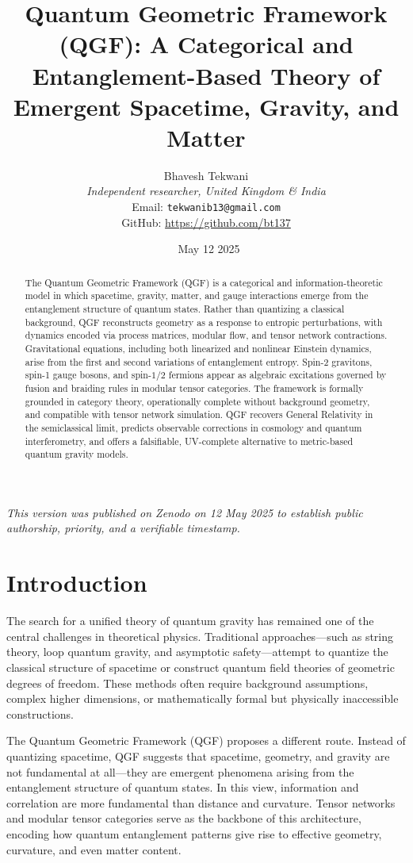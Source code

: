 \documentclass[11pt]{article}
\title{Quantum Geometric Framework (QGF): A Categorical and Entanglement-Based Theory of Emergent Spacetime, Gravity, and Matter}
\author{
  Bhavesh Tekwani \\
  \textit{Independent researcher, United Kingdom \& India} \\
  Email: \texttt{tekwanib13@gmail.com} \\
  GitHub: \url{https://github.com/bt137}
}
\date{\ May 12 2025}
\def\frac#1#2{#1/#2}
\begin{document}
\maketitle

\begin{abstract}
The Quantum Geometric Framework (QGF) is a categorical and information-theoretic model in which spacetime, gravity, matter, and gauge interactions emerge from the entanglement structure of quantum states. Rather than quantizing a classical background, QGF reconstructs geometry as a response to entropic perturbations, with dynamics encoded via process matrices, modular flow, and tensor network contractions. Gravitational equations, including both linearized and nonlinear Einstein dynamics, arise from the first and second variations of entanglement entropy. Spin-2 gravitons, spin-1 gauge bosons, and spin-$\frac{1}{2}$ fermions appear as algebraic excitations governed by fusion and braiding rules in modular tensor categories. The framework is formally grounded in category theory, operationally complete without background geometry, and compatible with tensor network simulation. QGF recovers General Relativity in the semiclassical limit, predicts observable corrections in cosmology and quantum interferometry, and offers a falsifiable, UV-complete alternative to metric-based quantum gravity models.
\end{abstract}


\vspace{1ex}
\noindent\textit{This version was published on Zenodo on 12 May 2025 to establish public authorship, priority, and a verifiable timestamp.}

\tableofcontents
\newpage

\section{Introduction}

The search for a unified theory of quantum gravity has remained one of the central challenges in theoretical physics. Traditional approaches—such as string theory, loop quantum gravity, and asymptotic safety—attempt to quantize the classical structure of spacetime or construct quantum field theories of geometric degrees of freedom. These methods often require background assumptions, complex higher dimensions, or mathematically formal but physically inaccessible constructions.

The Quantum Geometric Framework (QGF) proposes a different route. Instead of quantizing spacetime, QGF suggests that spacetime, geometry, and gravity are not fundamental at all—they are emergent phenomena arising from the entanglement structure of quantum states. In this view, information and correlation are more fundamental than distance and curvature. Tensor networks and modular tensor categories serve as the backbone of this architecture, encoding how quantum entanglement patterns give rise to effective geometry, curvature, and even matter content.
\end{document}
